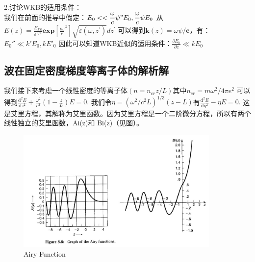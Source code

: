 \documentclass[12pt]{article}
\begin{document}
2.讨论WKB的适用条件：
\\
我们在前面的推导中假定：$\displaystyle E_{0}<<\frac{\omega}{c}\psi"E_{0},\frac{\omega}{c}\psi E_{0}$
从$\displaystyle E(z)=\frac{E_{F S}}{\varepsilon^{1/4}}\mathbf{exp}[\frac{i\omega}{c}^{z}]\sqrt{\varepsilon(\omega,z^{\prime})}d z^{\prime}$
可以得到$\mathbf{k}(z)=\omega\psi/\mathbf{c}$，有：$E_0''\ll k'E_0,kE'_0$
因此可以知道WKB近似的适用条件：$\displaystyle \frac{\partial E_0}{\partial z}\ll kE_0$


\subsection{波在固定密度梯度等离子体的解析解}
我们接下来考虑一个线性密度的等离子体$(n = n_{cr}z/L)$其中$n_{cr} = m\omega^2/4\pi e^2$\cite{lasertextbook1122}
可以得到$\displaystyle \frac{\mathrm{d}^2E}{\mathrm{d}z^2}+\frac{\omega^2}{c^2}\left(1-\frac{z}{L}\right)E=0.$
我们令$\eta = (\omega^2/c^2L)^{1/3}(z-L)$有$\displaystyle \frac{\mathrm{d}^2E}{\mathrm{d}\eta^2}-\eta E=0.$
这是艾里方程，其解称为艾里函数。因为艾里方程是一个二阶微分方程，所以有两个线性独立的艾里函数，Ai(z)和 Bi(z)（见图）。
\begin{figure}
    \centering
	\includegraphics[width=10cm]{airyfunction.jpg}
	\caption{Airy Function}
\end{figure}
\end{document}
